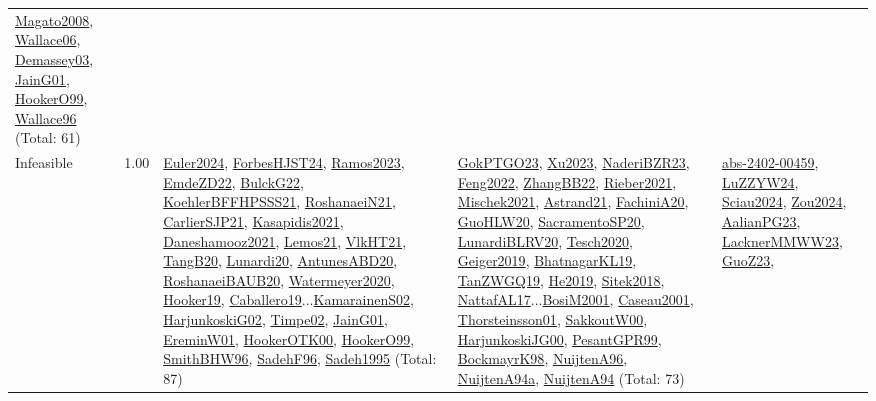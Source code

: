 {\begin{longtable}{p{3cm}r>{\raggedright\arraybackslash}p{6cm}>{\raggedright\arraybackslash}p{6cm}>{\raggedright\arraybackslash}p{8cm}}
\hyperref[detail:Magato2008]{Magato2008}, \hyperref[detail:Wallace06]{Wallace06}, \hyperref[detail:Demassey03]{Demassey03}, \hyperref[detail:JainG01]{JainG01}, \hyperref[detail:HookerO99]{HookerO99}, \hyperref[detail:Wallace96]{Wallace96} (Total: 61)\\
\index{Infeasible}\index{Concepts!Infeasible}Infeasible &  1.00 & \hyperref[detail:Euler2024]{Euler2024}, \hyperref[detail:ForbesHJST24]{ForbesHJST24}, \hyperref[detail:Ramos2023]{Ramos2023}, \hyperref[detail:EmdeZD22]{EmdeZD22}, \hyperref[detail:BulckG22]{BulckG22}, \hyperref[detail:KoehlerBFFHPSSS21]{KoehlerBFFHPSSS21}, \hyperref[detail:RoshanaeiN21]{RoshanaeiN21}, \hyperref[detail:CarlierSJP21]{CarlierSJP21}, \hyperref[detail:Kasapidis2021]{Kasapidis2021}, \hyperref[detail:Daneshamooz2021]{Daneshamooz2021}, \hyperref[detail:Lemos21]{Lemos21}, \hyperref[detail:VlkHT21]{VlkHT21}, \hyperref[detail:TangB20]{TangB20}, \hyperref[detail:Lunardi20]{Lunardi20}, \hyperref[detail:AntunesABD20]{AntunesABD20}, \hyperref[detail:RoshanaeiBAUB20]{RoshanaeiBAUB20}, \hyperref[detail:Watermeyer2020]{Watermeyer2020}, \hyperref[detail:Hooker19]{Hooker19}, \hyperref[detail:Caballero19]{Caballero19}...\hyperref[detail:KamarainenS02]{KamarainenS02}, \hyperref[detail:HarjunkoskiG02]{HarjunkoskiG02}, \hyperref[detail:Timpe02]{Timpe02}, \hyperref[detail:JainG01]{JainG01}, \hyperref[detail:EreminW01]{EreminW01}, \hyperref[detail:HookerOTK00]{HookerOTK00}, \hyperref[detail:HookerO99]{HookerO99}, \hyperref[detail:SmithBHW96]{SmithBHW96}, \hyperref[detail:SadehF96]{SadehF96}, \hyperref[detail:Sadeh1995]{Sadeh1995} (Total: 87) & \hyperref[detail:GokPTGO23]{GokPTGO23}, \hyperref[detail:Xu2023]{Xu2023}, \hyperref[detail:NaderiBZR23]{NaderiBZR23}, \hyperref[detail:Feng2022]{Feng2022}, \hyperref[detail:ZhangBB22]{ZhangBB22}, \hyperref[detail:Rieber2021]{Rieber2021}, \hyperref[detail:Mischek2021]{Mischek2021}, \hyperref[detail:Astrand21]{Astrand21}, \hyperref[detail:FachiniA20]{FachiniA20}, \hyperref[detail:GuoHLW20]{GuoHLW20}, \hyperref[detail:SacramentoSP20]{SacramentoSP20}, \hyperref[detail:LunardiBLRV20]{LunardiBLRV20}, \hyperref[detail:Tesch2020]{Tesch2020}, \hyperref[detail:Geiger2019]{Geiger2019}, \hyperref[detail:BhatnagarKL19]{BhatnagarKL19}, \hyperref[detail:TanZWGQ19]{TanZWGQ19}, \hyperref[detail:He2019]{He2019}, \hyperref[detail:Sitek2018]{Sitek2018}, \hyperref[detail:NattafAL17]{NattafAL17}...\hyperref[detail:BosiM2001]{BosiM2001}, \hyperref[detail:Caseau2001]{Caseau2001}, \hyperref[detail:Thorsteinsson01]{Thorsteinsson01}, \hyperref[detail:SakkoutW00]{SakkoutW00}, \hyperref[detail:HarjunkoskiJG00]{HarjunkoskiJG00}, \hyperref[detail:PesantGPR99]{PesantGPR99}, \hyperref[detail:BockmayrK98]{BockmayrK98}, \hyperref[detail:NuijtenA96]{NuijtenA96}, \hyperref[detail:NuijtenA94a]{NuijtenA94a}, \hyperref[detail:NuijtenA94]{NuijtenA94} (Total: 73) & \hyperref[detail:abs-2402-00459]{abs-2402-00459}, \hyperref[detail:LuZZYW24]{LuZZYW24}, \hyperref[detail:Sciau2024]{Sciau2024}, \hyperref[detail:Zou2024]{Zou2024}, \hyperref[detail:AalianPG23]{AalianPG23}, \hyperref[detail:LacknerMMWW23]{LacknerMMWW23}, \hyperref[detail:GuoZ23]{GuoZ23}, 
\end{longtable}}
